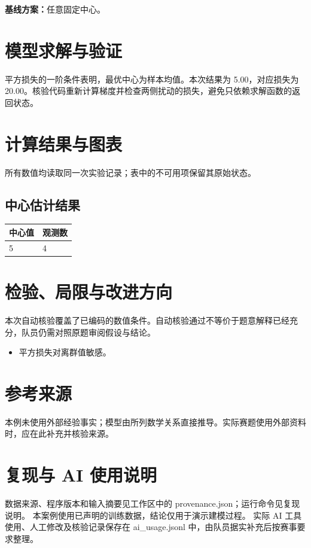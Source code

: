 \documentclass[UTF8,a4paper,11pt,fontset=fandol]{ctexart}
\begin{document}
\noindent\textbf{基线方案：}任意固定中心。


\section{模型求解与验证}
平方损失的一阶条件表明，最优中心为样本均值。本次结果为 5.00，对应损失为 20.00。核验代码重新计算梯度并检查两侧扰动的损失，避免只依赖求解函数的返回状态。


\section{计算结果与图表}
所有数值均读取同一次实验记录；表中的不可用项保留其原始状态。

\subsection*{中心估计结果}
{\small
\begin{longtable}{ll}
\toprule
中心值 & 观测数 \\ 
\midrule\endhead

5 & 4 \\ 

\bottomrule
\end{longtable}}



\section{检验、局限与改进方向}
本次自动核验覆盖了已编码的数值条件。自动核验通过不等价于题意解释已经充分，队员仍需对照原题审阅假设与结论。
\begin{itemize}

\item 平方损失对离群值敏感。

\end{itemize}

\section*{参考来源}

本例未使用外部经验事实；模型由所列数学关系直接推导。实际赛题使用外部资料时，应在此补充并核验来源。

\section*{复现与 AI 使用说明}
数据来源、程序版本和输入摘要见工作区中的 provenance.json；运行命令见复现说明。
本案例使用已声明的训练数据，结论仅用于演示建模过程。
实际 AI 工具使用、人工修改及核验记录保存在 ai\_usage.jsonl 中，由队员据实补充后按赛事要求整理。
\end{document}
